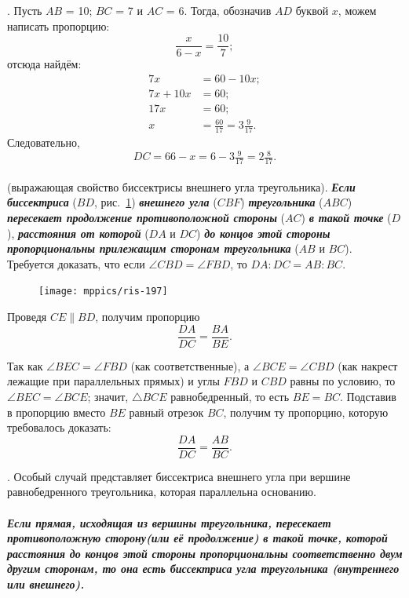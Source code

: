 \documentclass[oneside]{book}
\begin{document}
\medskip

\smallskip
{}.
Пусть $AB$ = 10;
$BC$ = 7 и $AC$ = 6.
Тогда, обозначив $AD$ буквой $x$, можем написать пропорцию:
\[\frac{x}{6 - x} = \frac{10}7;\]
отсюда найдём:
\begin{align*}
7x&=60-10x;
\\
7x+10x&=60;
\\
17x&=60;
\\
x&=\tfrac{60}{17}=3\tfrac9{17}.
\end{align*}
Следовательно,
\[DC=66-x=6-3\tfrac9{17}=2\tfrac8{17}.\]

\paragraph{}\label{1938/187}
 (выражающая свойство биссектрисы внешнего угла треугольника).
\textbf{\emph{Если биссектриса}} ($BD$, рис.~\ref{1938/ris-197}) \textbf{\emph{внешнего угла}} ($CBF$) \textbf{\emph{треугольника}} ($ABC$) \textbf{\emph{пересекает продолжение противоположной стороны}} ($AC$) \textbf{\emph{в такой точке}} ($D$), \textbf{\emph{расстояния от которой}} ($DA$ и $DC$) \textbf{\emph{до концов этой стороны пропорциональны прилежащим сторонам треугольника}} ($AB$ и $BC$).
Требуется доказать, что если $\angle CBD=\angle FBD$, то $DA:DC=AB:BC$.

\begin{figure}
\centering
\texttt{[image: mppics/ris-197]}
\caption{}\label{1938/ris-197}
\end{figure}

Проведя $CE \parallel BD$, получим пропорцию
\[\frac{DA}{DC}=\frac{BA}{BE}.\]

Так как $\angle BEC=\angle FBD$ (как соответственные), а $\angle BCE=\angle CBD$ (как накрест лежащие при параллельных прямых) и углы $FBD$ и $CBD$ равны по условию, то $\angle BEC=\angle BCE$;
значит, $\triangle BCE$ равнобедренный, то есть $BE=BC$.
Подставив в пропорцию вместо $BE$ равный отрезок $BC$, получим ту пропорцию, которую требовалось доказать:
\[\frac{DA}{DC}=\frac{AB}{BC}.\]

\smallskip
{}.
Особый случай представляет биссектриса внешнего угла при вершине равнобедренного треугольника, которая параллельна основанию.

\paragraph{}\label{1914/227}
\textbf{\emph{Если прямая, исходящая из вершины треугольника, пересекает противоположную сторону(или её продолжение) в такой точке, которой расстояния до концов этой стороны пропорциональны соответственно двум другим сторонам, то она есть биссектриса угла треугольника (внутреннего или внешнего).}}
\end{document}
